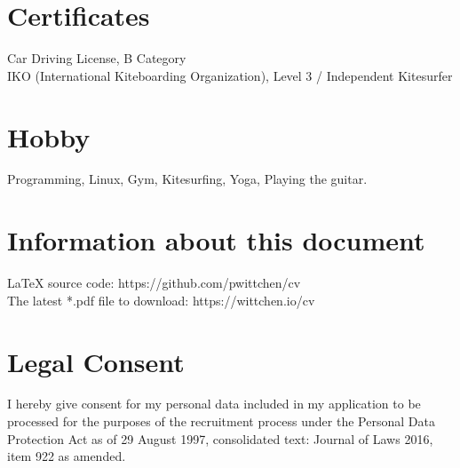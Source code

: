 \documentclass[letterpaper,11pt]{article}
\begin{document}
\section{Certificates}
 \begin{itemize}[leftmargin=0.15in, label={}]
    \small{\item{
    {Car Driving License, B Category} \\
    {IKO (International Kiteboarding Organization), Level 3 / Independent Kitesurfer}\\
    }}
 \end{itemize}

\section{Hobby}
 \begin{itemize}[leftmargin=0.15in, label={}]
    \small{\item{
     Programming, Linux, Gym, Kitesurfing, Yoga, Playing the guitar.\\
    }}
 \end{itemize}

\section{Information about this document}
 \begin{itemize}[leftmargin=0.15in, label={}]
    \small{\item{
    {LaTeX source code: https://github.com/pwittchen/cv} \\
    {The latest *.pdf file to download: https://wittchen.io/cv}
    }}
 \end{itemize}

\section{Legal Consent}
 \begin{itemize}[leftmargin=0.15in, label={}]
    \small{\item{
    I hereby give consent for my personal data included in my application
    to be processed for the purposes of the recruitment process
    under the Personal Data Protection Act as of 29 August 1997,
    consolidated text: Journal of Laws 2016, item 922 as amended. \\
    }}
 \end{itemize}

\end{document}
